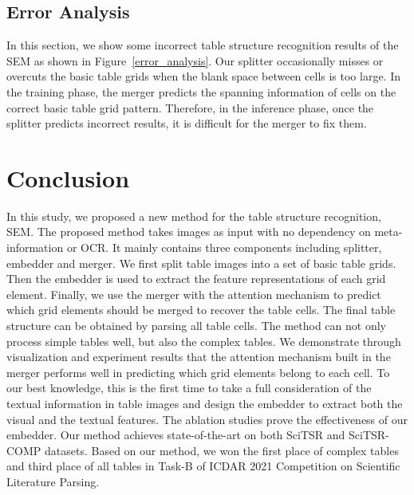 \documentclass[review]{elsarticle}
\begin{document}
\subsection{Error Analysis}
In this section, we show some incorrect table structure recognition results of the SEM as shown in Figure~\ref{error_analysis}. Our splitter occasionally misses or overcuts the basic table grids when the blank space between cells is too large. In the training phase, the merger predicts the spanning information of cells on the correct basic table grid pattern. Therefore, in the inference phase, once the splitter predicts incorrect results, it is difficult for the merger to fix them.

\section{Conclusion}
In this study, we proposed a new method for the table structure recognition, SEM. The proposed method takes images as input with no dependency on meta-information or OCR. It mainly contains three components including splitter, embedder and merger. We first split table images into a set of basic table grids. Then the embedder is used to extract the feature representations of each grid element. Finally, we use the merger with the attention mechanism to predict which grid elements should be merged to recover the table cells. The final table structure can be obtained by parsing all table cells. The method can not only process simple tables well, but also the complex tables. We demonstrate through visualization and experiment results that the attention mechanism built in the merger performs well in predicting which grid elements belong to each cell. To our best knowledge, this is the first time to take a full consideration of the textual information in table images and design the embedder to extract both the visual and the textual features. The ablation studies prove the effectiveness of our embedder. Our method achieves state-of-the-art on both SciTSR and SciTSR-COMP datasets. Based on our method, we won the first place of complex tables and third place of all tables in Task-B of ICDAR 2021 Competition on Scientific Literature Parsing.



\end{document}
